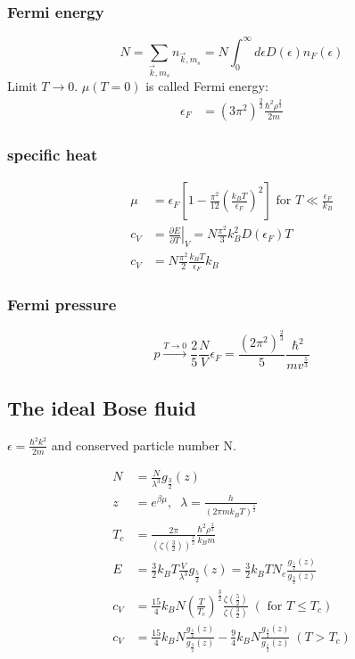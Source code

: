 \subsubsection*{Fermi energy}
\[
    N = \sum_{\vec{k},m_s} n_{\vec{k},m_s} = N \int_0^\infty d\epsilon D(\epsilon) n_F(\epsilon)
\]
Limit $T \rightarrow 0$. $\mu(T=0)$ is called Fermi energy:
\[
    \begin{aligned}
        \epsilon_F &= (3\pi^2)^{\frac{2}{3}} \frac{\hbar^2 \rho^{\frac{2}{3}}}{2m}
    \end{aligned}
\]

\subsubsection*{specific heat}
\[
    \begin{aligned}
        \mu &= \epsilon_F \left[1-\frac{\pi^2}{12} \left(\frac{k_B T}{\epsilon_F}\right)^2\right] \text{ for } T \ll \frac{\epsilon_F}{k_B} \\
        c_V &= \left. \frac{\partial E}{\partial T} \right|_V = N \frac{\pi^2}{3} k_B^2 D(\epsilon_F)T \\
        c_V &= N \frac{\pi^2}{2} \frac{k_B T}{\epsilon_F} k_B
    \end{aligned}
\]

\subsubsection*{Fermi pressure}

\[
    p \overset{T\rightarrow 0}{\rightarrow}\frac{2}{5} \frac{N}{V}\epsilon_F = \frac{(2\pi^2)^{\frac{2}{3}}}{5} \frac{\hbar^2}{mv^{\frac{5}{3}}}
\]

\subsection*{The ideal Bose fluid}
$\epsilon = \frac{\hbar^2 k^2}{2m}$ and conserved particle number N.

\[
    \begin{aligned}
        N &= \frac{N}{\lambda^3} g_{\frac{3}{2}} (z) \\
        z &= e^{\beta \mu}, \;\; \lambda = \frac{h}{(2 \pi m k_B T)^{\frac{1}{2}}} \\
        T_c &= \frac{2 \pi}{\left(\zeta\left(\frac{3}{2}\right)\right)^{\frac{3}{2}}} \frac{\hbar^2 \rho^{\frac{2}{3}}}{k_B m} \\
        E &= \frac{3}{2} k_B T \frac{V}{\lambda^3} g_{\frac{5}{2}}(z) = \frac{3}{2} k_B T N_e \frac{g_{\frac{5}{2}}(z)}{g_{\frac{3}{2}}(z)} \\
        c_V &= \frac{15}{4} k_B N \left(\frac{T}{T_c}\right)^{\frac{3}{2}} \frac{\zeta\left(\frac{5}{2}\right)}{\zeta\left(\frac{3}{2}\right)} \;( \text{ for } T \leq T_c) \\
        c_V &= \frac{15}{4} k_B N \frac{g_{\frac{5}{2}}(z)}{g_{\frac{3}{2}}(z)} - \frac{9}{4}k_B N \frac{g_{\frac{3}{2}}(z)}{g_{\frac{1}{2}}(z)}  \;( T > T_c) \\
    \end{aligned}
\]

